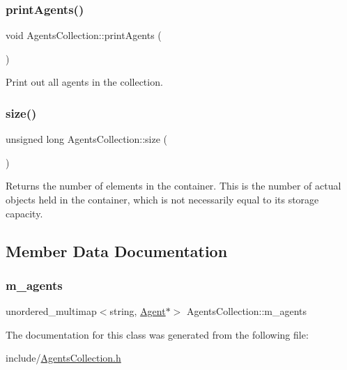 \subsubsection{\texorpdfstring{printAgents()}{printAgents()}}
{\footnotesize\ttfamily void Agents\+Collection\+::print\+Agents (\begin{DoxyParamCaption}{ }\end{DoxyParamCaption})}

Print out all agents in the collection. \mbox{\label{class_agents_collection_a3226f7eb58b11623bdb353d8938f60d3}} 
\subsubsection{\texorpdfstring{size()}{size()}}
{\footnotesize\ttfamily unsigned long Agents\+Collection\+::size (\begin{DoxyParamCaption}{ }\end{DoxyParamCaption})}

\begin{DoxyReturn}{Returns}
the number of elements in the container. This is the number of actual objects held in the container, which is not necessarily equal to its storage capacity. 
\end{DoxyReturn}


\subsection{Member Data Documentation}
\mbox{\label{class_agents_collection_a35a5728b0e0108c2f37897720c904dd1}} 
\subsubsection{\texorpdfstring{m\_agents}{m\_agents}}
{\footnotesize\ttfamily unordered\+\_\+multimap$<$string, \mbox{\hyperlink{class_agent}{Agent}}$\ast$$>$ Agents\+Collection\+::m\+\_\+agents\hspace{0.3cm}{\ttfamily [private]}}



The documentation for this class was generated from the following file\+:\begin{DoxyCompactItemize}
\item 
include/\mbox{\hyperlink{_agents_collection_8h}{Agents\+Collection.\+h}}\end{DoxyCompactItemize}
